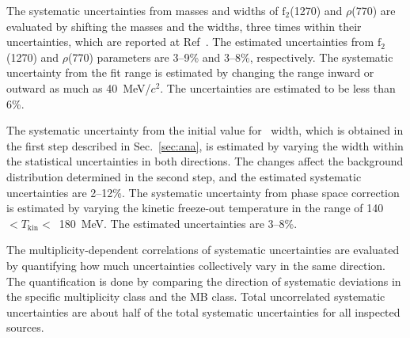 The systematic uncertainties from masses and widths of $\mathrm{f}_{2}$(1270) and $\rho$(770) are evaluated by shifting the masses and the widths, three times within their uncertainties, which are reported at Ref~\cite{ParticleDataGroup:2020ssz}. The estimated uncertainties from $\mathrm{f}_{2}$(1270) and $\rho$(770) parameters are 3--9\% and 3--8\%, respectively. The systematic uncertainty from the fit range is estimated by changing the range inward or outward as much as 40~MeV/$c^{2}$. The uncertainties are estimated to be 
less than 6\%.

The systematic uncertainty from the initial value for \fzero~width, which is obtained in the first step described in Sec.~\ref{sec:ana}, is estimated by varying the width within the statistical uncertainties in both directions. The changes affect the background distribution determined in the second step, and the estimated systematic uncertainties are 2--12\%. The systematic uncertainty from phase space correction is estimated by varying the kinetic freeze-out temperature in the range of 140~$<T_{\mathrm{kin}}<$~180~MeV. The estimated uncertainties are 3--8\%. 

The multiplicity-dependent correlations of systematic uncertainties are evaluated by quantifying how much uncertainties collectively vary in the same direction. The quantification is done by comparing the direction of systematic deviations in the specific multiplicity class and the MB class. Total uncorrelated systematic uncertainties are about half of the total systematic uncertainties for all inspected sources.





